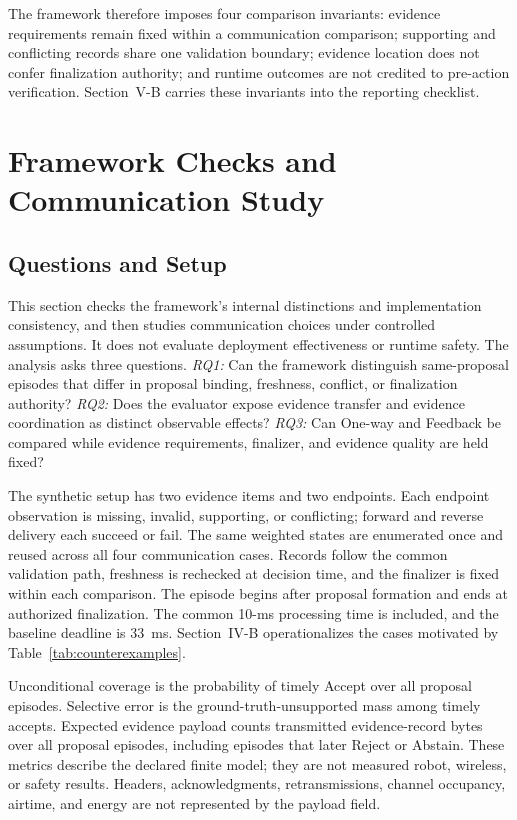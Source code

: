 The framework therefore imposes four comparison invariants: evidence
requirements remain fixed within a communication comparison; supporting and
conflicting records share one validation boundary; evidence location does not
confer finalization authority; and runtime outcomes are not credited to
pre-action verification. Section~V-B carries these invariants into the
reporting checklist.

\section{Framework Checks and Communication Study}

\subsection{Questions and Setup}

This section checks the framework's internal distinctions and implementation
consistency, and then studies communication choices under controlled
assumptions. It does not evaluate deployment effectiveness or runtime safety.
The analysis asks three questions. \emph{RQ1:} Can the framework distinguish
same-proposal episodes that differ in proposal binding, freshness, conflict, or
finalization authority? \emph{RQ2:} Does the evaluator expose evidence transfer and evidence
coordination as distinct observable effects? \emph{RQ3:} Can One-way and
Feedback be compared while evidence requirements, finalizer, and evidence
quality are held fixed?

The synthetic setup has two evidence items and two endpoints. Each endpoint
observation is missing, invalid, supporting, or conflicting; forward and
reverse delivery each succeed or fail. The same \ExactStateSpaceSize{} weighted
states are enumerated once and reused across all four communication cases.
Records follow the common validation path, freshness is rechecked at decision
time, and the finalizer is fixed within each comparison. The episode begins
after proposal formation and ends at authorized finalization. The common 10-ms
processing time is included, and the baseline deadline is 33~ms. Section~IV-B
operationalizes the cases motivated by Table~\ref{tab:counterexamples}.

Unconditional coverage is the probability of timely Accept over all proposal
episodes. Selective error is the ground-truth-unsupported mass among timely
accepts. Expected evidence payload counts transmitted evidence-record bytes
over all proposal episodes, including episodes that later Reject or Abstain.
These metrics describe the declared finite model; they are not measured robot,
wireless, or safety results. Headers, acknowledgments, retransmissions, channel
occupancy, airtime, and energy are not represented by the payload field.

